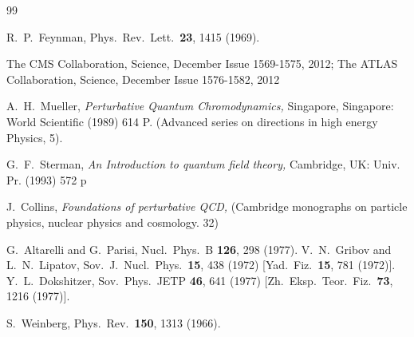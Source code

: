 \documentclass[aps,prd,preprint,tightenlines,superscriptaddress]{revtex4}
\begin{document}
\begin{thebibliography}{99}

  R.~P.~Feynman,
  Phys.\ Rev.\ Lett.\  {\bf 23}, 1415 (1969).

The CMS Collaboration, Science,  December Issue 1569-1575, 2012;
The ATLAS Collaboration, Science, December Issue 1576-1582, 2012

  A.~H.~Mueller,
{\it Perturbative Quantum Chromodynamics,}
  Singapore, Singapore: World Scientific (1989) 614 P. (Advanced series on directions in high energy Physics, 5). 

  G.~F.~Sterman,
{\it An Introduction to quantum field theory,}
  Cambridge, UK: Univ. Pr. (1993) 572 p

  J.~Collins,
{\it  Foundations of perturbative QCD,}
  (Cambridge monographs on particle physics, nuclear physics and cosmology. 32)

  G.~Altarelli and G.~Parisi,
  Nucl.\ Phys.\ B {\bf 126}, 298 (1977).
  V.~N.~Gribov and L.~N.~Lipatov,
  Sov.\ J.\ Nucl.\ Phys.\  {\bf 15}, 438 (1972)
  [Yad.\ Fiz.\  {\bf 15}, 781 (1972)].
  Y.~L.~Dokshitzer,
  Sov.\ Phys.\ JETP {\bf 46}, 641 (1977)
  [Zh.\ Eksp.\ Teor.\ Fiz.\  {\bf 73}, 1216 (1977)].


  S.~Weinberg,
  Phys.\ Rev.\  {\bf 150}, 1313 (1966).


\end{thebibliography}
\end{document}
